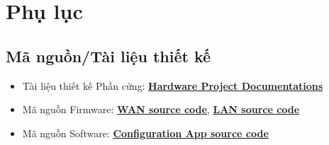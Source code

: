 \chapter{Phụ lục}
    \section{Mã nguồn/Tài liệu thiết kế}
        \begin{itemize}
            \item Tài liệu thiết kế Phần cứng: \href{https://drive.google.com/drive/folders/1IrFrjBZtOsbTgmNe-64czuGsoSjKp458?usp=drive_link}{\textbf{Hardware Project Documentations}}
            \item Mã nguồn Firmware: \href{https://github.com/NguyenHoangTrieu/DA2_esp}{\textbf{WAN source code}}, \href{https://github.com/NguyenHoangTrieu/DA2_esp_LAN}{\textbf{LAN source code}}
            \item Mã nguồn Software: \href{https://github.com/NguyenHoangTrieu/DATN_config_app}{\textbf{Configuration App source code}}
        \end{itemize}